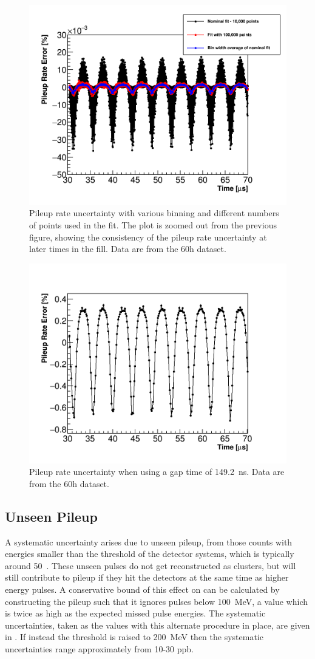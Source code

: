 \begin{figure}
    \centering
    \includegraphics[width=.6\textwidth]{PileupRateError_ZoomedOut}
    \caption[]{Pileup rate uncertainty with various binning and different numbers of points used in the fit. The plot is zoomed out from the previous figure, showing the consistency of the pileup rate uncertainty at later times in the fill. Data are from the 60h dataset.}
    \label{fig:pileupRateErrorZoomed}
\end{figure}


\begin{figure}
    \centering
    \includegraphics[width=.6\textwidth]{PileupRateError_149p2SGT}
    \caption[]{Pileup rate uncertainty when using a gap time of \SI{149.2}{\ns}. Data are from the 60h dataset.}
    \label{fig:pileupRateErrorLarger}
\end{figure}




\clearpage
\subsection{Unseen Pileup}

A systematic uncertainty arises due to unseen pileup, from those counts with energies smaller than the threshold of the detector systems, which is typically around 50~\MeV. These unseen pulses do not get reconstructed as clusters, but will still contribute to pileup if they hit the detectors at the same time as higher energy pulses. A conservative bound of this effect on \R can be calculated by constructing the pileup such that it ignores pulses below \SI{100}{\MeV}, a value which is twice as high as the expected missed pulse energies. The systematic uncertainties, taken as the \DR values with this alternate procedure in place, are given in . If instead the threshold is raised to \SI{200}{\MeV} then the systematic uncertainties range approximately from 10-30 ppb.


